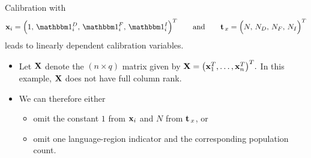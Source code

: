 \documentclass{my_eth_beamer}
\numberwithin{equation}{section}
\begin{document}
\begin{frame}
    \begin{Bsp}
        Calibration with
        \begin{equation*}
            \vx_i =
            \Big(1,\,\indicator_i^D,\,\indicator_i^F,\,
                \indicator_i^I\Big)^T
            \qquad \text{and} \qquad
            \tvx =
            \Big(N,\,N_D,\,N_F,\,N_I\Big)^T
        \end{equation*}
        leads to \alert{linearly dependent calibration variables}.
    \end{Bsp}
    \vspace{0.5em}
    \begin{itemize}
    \setlength{\itemsep}{10pt}
        \item Let $\bold X$ denote the $(n\times q)$ \alert{matrix} given by
            $\bold X = \big(\bold{x}_1^T,\ldots,\bold{x}_n^T\big)^T.$
            In this example, $\bold X$ does \alert{not have full column rank}.
        \item We can therefore either
            \vspace{0.25em}
            \begin{itemize}
            \setlength{\itemsep}{5pt}
                \item omit the constant $1$ from $\bold{x}_i$ and $N$ from
                    $\bold{t}_{\,x}$, or
                \item omit one language-region indicator and the
                    corresponding population count.
            \end{itemize}
    \end{itemize}
\end{frame}
\end{document}

